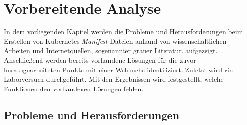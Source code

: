\chapter{Vorbereitende Analyse}\label{ch:preparation-analysis}

In dem vorliegenden Kapitel werden die Probleme und Herausforderungen beim Erstellen von Kubernetes \textit{Manifest}-Dateien anhand von wissenschaftlichen Arbeiten
und Internetquellen, sogenannter grauer Literatur, aufgezeigt. Anschließend werden bereits vorhandene Lösungen für die zuvor herausgearbeiteten Punkte mit einer Websuche identifiziert.
Zuletzt wird ein Laborversuch durchgeführt. Mit den Ergebnissen wird festgestellt, welche Funktionen den vorhandenen Lösungen fehlen.

\section{Probleme und Herausforderungen}

